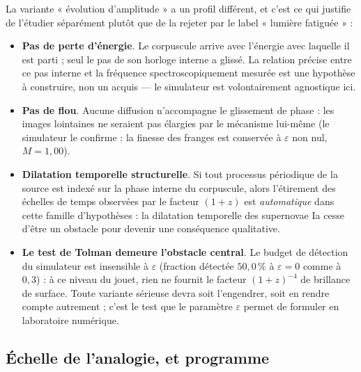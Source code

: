 La variante « évolution d'amplitude » a un profil différent, et c'est ce qui
justifie de l'étudier séparément plutôt que de la rejeter par le label
« lumière fatiguée » :
\begin{itemize}[leftmargin=1.6em,itemsep=0.15em]
  \item \textbf{Pas de perte d'énergie}. Le corpuscule arrive avec l'énergie avec
        laquelle il est parti ; seul le pas de son horloge interne a glissé. La
        relation précise entre ce pas interne et la fréquence spectroscopiquement
        mesurée est une hypothèse à construire, non un acquis --- le simulateur
        est volontairement agnostique ici.
  \item \textbf{Pas de flou}. Aucune diffusion n'accompagne le glissement de
        phase : les images lointaines ne seraient pas élargies par le mécanisme
        lui-même (le simulateur le confirme : la finesse des franges est
        conservée à $\varepsilon$ non nul, $M = 1{,}00$).
  \item \textbf{Dilatation temporelle structurelle}. Si tout processus
        périodique de la source est indexé sur la phase interne du corpuscule,
        alors l'étirement des échelles de temps observées par le facteur
        $(1+z)$ est \emph{automatique} dans cette famille d'hypothèses : la
        dilatation temporelle des supernovae Ia cesse d'être un obstacle pour
        devenir une conséquence qualitative.
  \item \textbf{Le test de Tolman demeure l'obstacle central}. Le budget de
        détection du simulateur est insensible à $\varepsilon$ (fraction
        détectée $50{,}0\,\%$ à $\varepsilon = 0$ comme à $0{,}3$) : à ce niveau
        du jouet, rien ne fournit le facteur $(1+z)^{-4}$ de brillance de
        surface. Toute variante sérieuse devra soit l'engendrer, soit en
        rendre compte autrement ; c'est le test que le paramètre $\varepsilon$
        permet de formuler en laboratoire numérique.
\end{itemize}

\subsection{Échelle de l'analogie, et programme}

